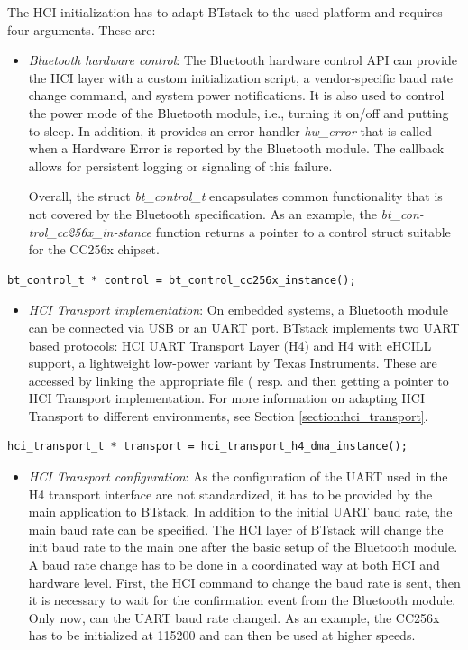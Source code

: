 \documentclass[a4paper,titlepage,oneside,12pt]{amsart} %
\begin{document}
The HCI initialization has to adapt BTstack to the used platform and requires four arguments. These are:
\begin{itemize}
\item \emph{Bluetooth hardware control}: The Bluetooth hardware control API can provide the HCI layer with a custom initialization script, a vendor-specific baud rate change command, and system power notifications. It is also used to control the power mode of the Bluetooth module, i.e., turning it on/off and putting to sleep. In addition, it provides an error handler \emph{hw\_error} that is called when a Hardware Error is reported by the Bluetooth module. The callback allows for persistent logging or signaling of this failure. 

Overall, the struct \emph{bt\_control\_t} encapsulates common functionality that is not covered by the Bluetooth specification. As an example, the \emph{bt\_con-trol\_cc256x\_in-stance} function returns a pointer to a control struct suitable for the CC256x chipset.
\end{itemize}

\begin{lstlisting}
bt_control_t * control = bt_control_cc256x_instance();
\end{lstlisting}

\begin{itemize}
\item \emph{HCI Transport implementation}: On embedded systems, a Bluetooth module can be connected via USB or an UART port. BTstack implements two UART based protocols: HCI UART Transport Layer (H4) and H4 with eHCILL support, a lightweight low-power variant by Texas Instruments.
These are accessed by linking the appropriate file ( resp.  and then getting a pointer to HCI Transport implementation. For more information on adapting HCI Transport to different environments, see Section \ref{section:hci_transport}.
\end{itemize}

\begin{lstlisting}
hci_transport_t * transport = hci_transport_h4_dma_instance();
\end{lstlisting}

\begin{itemize}
\item \emph {HCI Transport configuration}: As the configuration of the UART used in the H4 transport interface are not standardized, it has to be provided by the main application to BTstack. In addition to the initial UART baud rate, the main baud rate can be specified. The HCI layer of BTstack will change the init baud rate to the main one after the basic setup of the Bluetooth module. A baud rate change has to be done in a coordinated way at both HCI and hardware level. First, the HCI command to change the baud rate is sent, then it is necessary to wait for the confirmation event from the Bluetooth module. Only now, can the UART baud rate changed. As an example, the CC256x has to be initialized at 115200 and can then be used at higher speeds.
\end{itemize}
\end{document}
